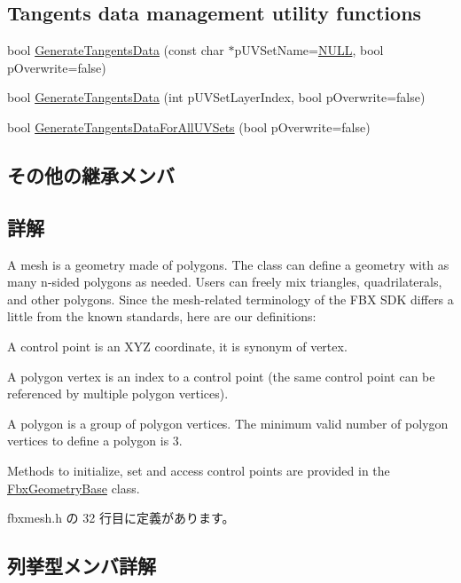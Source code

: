 \subsection*{Tangents data management utility functions}
\begin{DoxyCompactItemize}
\item 
bool \hyperlink{class_fbx_mesh_a7e8edf6f1cb66039f1a4aad23354a474}{Generate\+Tangents\+Data} (const char $\ast$p\+U\+V\+Set\+Name=\hyperlink{fbxarch_8h_a070d2ce7b6bb7e5c05602aa8c308d0c4}{N\+U\+LL}, bool p\+Overwrite=false)
\item 
bool \hyperlink{class_fbx_mesh_aca440ad11eb2fbeaa36cdeeff37e2551}{Generate\+Tangents\+Data} (int p\+U\+V\+Set\+Layer\+Index, bool p\+Overwrite=false)
\item 
bool \hyperlink{class_fbx_mesh_a0939d342aa2c0420c755dc1aa2594363}{Generate\+Tangents\+Data\+For\+All\+U\+V\+Sets} (bool p\+Overwrite=false)
\end{DoxyCompactItemize}
\subsection*{その他の継承メンバ}


\subsection{詳解}
A mesh is a geometry made of polygons. The class can define a geometry with as many n-\/sided polygons as needed. Users can freely mix triangles, quadrilaterals, and other polygons. Since the mesh-\/related terminology of the F\+BX S\+DK differs a little from the known standards, here are our definitions\+: \begin{DoxyItemize}
\item A control point is an X\+YZ coordinate, it is synonym of vertex. \item A polygon vertex is an index to a control point (the same control point can be referenced by multiple polygon vertices). \item A polygon is a group of polygon vertices. The minimum valid number of polygon vertices to define a polygon is 3.\end{DoxyItemize}
Methods to initialize, set and access control points are provided in the \hyperlink{class_fbx_geometry_base}{Fbx\+Geometry\+Base} class. 

 fbxmesh.\+h の 32 行目に定義があります。



\subsection{列挙型メンバ詳解}
\mbox{\label{class_fbx_mesh_ab9e7d41ffcd49467a374c72e0d6f3561}} 
